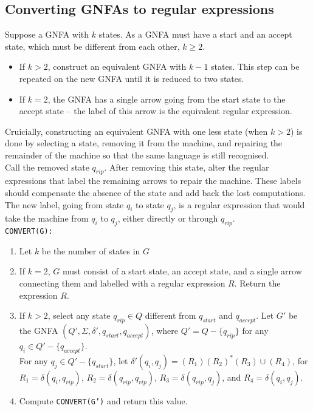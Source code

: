 \documentclass{article}
\begin{document}
\subsection{Converting GNFAs to regular expressions}
Suppose a GNFA with $k$ states. As a GNFA must have a start and an accept state, which must be different from each other, $k \geq 2$.
\begin{itemize}
	\item If $k > 2$, construct an equivalent GNFA with $k - 1$ states. This step can be repeated on the new GNFA until it is reduced to two states.
	\item If $k = 2$, the GNFA has a single arrow going from the start state to the accept state -- the label of this arrow is the equivalent regular expression.
\end{itemize}
Cruicially, constructing an equivalent GNFA with one less state (when $k > 2$) is done by selecting a state, removing it from the machine, and repairing the remainder of the machine so that the same language is still recognised.\medskip
\\ Call the removed state $q_{rip}$. After removing this state, alter the regular expressions that label the remaining arrows to repair the machine. These labels should compensate the absence of the state and add back the lost computations.\medskip
\\ The new label, going from state $q_i$ to state $q_j$, is a regular expression that would take the machine from $q_i$ to $q_j$, either directly or through $q_{rip}$.\medskip
\\\texttt{CONVERT(G):}
\begin{enumerate}
	\item Let $k$ be the number of states in $G$
	\item If $k=2$, $G$ must consist of a start state, an accept state, and a single arrow connecting them and labelled with a regular expression $R$. Return the expression $R$.
	\item If $k > 2$, select any state $q_{rip} \in Q$ different from $q_{start}$ and $q_{accept}$. Let $G'$ be the GNFA $(Q', \Sigma, \delta', q_{start}, q_{accept})$, where $Q' = Q - \{q_{rip}\}$ for any $q_i \in Q' - \{q_{accept}\}$.
	\\ For any $q_j \in Q' - \{q_{start}\}$, let $\delta'(q_i, q_j) = (R_1)(R_2)^*(R_3)\cup(R_4)$, for $R_1 = \delta(q_i, q_{rip})$, $R_2 = \delta(q_{rip}, q_{rip})$, $R_3 = \delta(q_{rip}, q_j)$, and $R_4 = \delta(q_i, q_j)$.
	\item Compute \texttt{CONVERT(G')} and return this value.
\end{enumerate}
\end{document}
